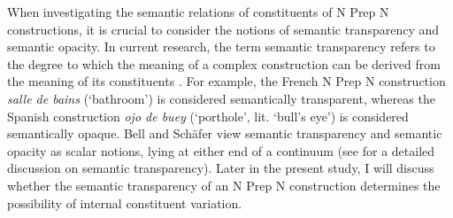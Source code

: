 \documentclass[output=paper]{langsci/langscibook}
\begin{document}
When investigating the semantic relations of constituents of N Prep N constructions, it is crucial to consider the notions of semantic transparency and semantic opacity. In current research, the term semantic transparency refers to the degree to which the meaning of a complex construction can be derived from the meaning of its constituents \citep{Zwitserlood:1994}. For example, the French N Prep N construction \textit{salle de bains} (`bathroom') is considered semantically transparent, whereas the Spanish construction \textit{ojo de buey} (`porthole', lit. `bull's eye') is considered semantically opaque. Bell and Schäfer view semantic transparency and semantic opacity as scalar notions, lying at either end of a continuum (see \citet{Bell:2016} for a detailed discussion on semantic transparency). Later in the present study, I will discuss whether the semantic transparency of an N Prep N construction determines the possibility of internal constituent variation.
\end{document}

